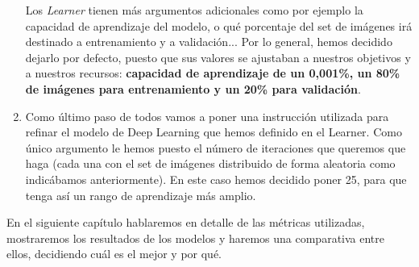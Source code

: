\begin{enumerate}
Los \textit{Learner} tienen más argumentos adicionales como por ejemplo la capacidad de aprendizaje del modelo, o qué porcentaje del set de imágenes irá destinado a entrenamiento y a validación... Por lo general, hemos decidido dejarlo por defecto, puesto que sus valores se ajustaban a nuestros objetivos y a nuestros recursos: \textbf{capacidad de aprendizaje de un 0,001\%, un 80\% de imágenes para entrenamiento y un 20\% para validación}.
\item Como último paso de todos vamos a poner una instrucción utilizada para refinar el modelo de Deep Learning que hemos definido en el Learner. Como único argumento le hemos puesto el número de iteraciones que queremos que haga (cada una con el set de imágenes distribuido de forma aleatoria como indicábamos anteriormente). En este caso hemos decidido poner 25, para que tenga así un rango de aprendizaje más amplio.

\end{enumerate}

En el siguiente capítulo hablaremos en detalle de las métricas utilizadas, mostraremos los resultados de los modelos y haremos una comparativa entre ellos, decidiendo cuál es el mejor y por qué.